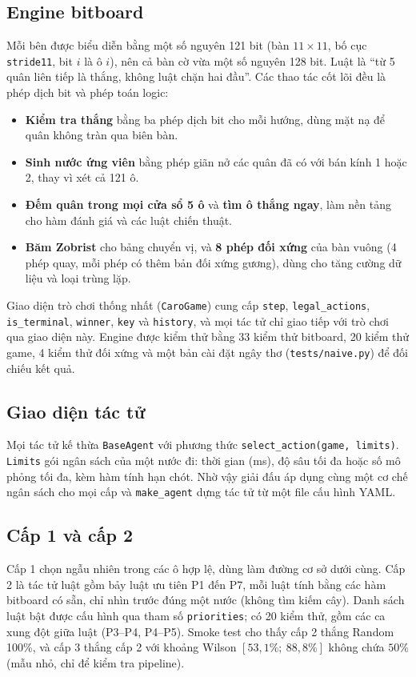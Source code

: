 \documentclass[12pt,a4paper]{report}
\newenvironment{gon}{\begin{itemize}\setlength{\itemsep}{2pt}\setlength{\parskip}{0pt}}{\end{itemize}}
\begin{document}
\subsection{Engine bitboard}
Mỗi bên được biểu diễn bằng một số nguyên 121 bit (bàn $11\times11$, bố cục \texttt{stride11}, bit $i$ là ô $i$), nên cả bàn cờ vừa một số nguyên 128 bit. Luật là ``từ 5 quân liên tiếp là thắng, không luật chặn hai đầu''. Các thao tác cốt lõi đều là phép dịch bit và phép toán logic:
\begin{gon}
  \item \textbf{Kiểm tra thắng} bằng ba phép dịch bit cho mỗi hướng, dùng mặt nạ để quân không tràn qua biên bàn.
  \item \textbf{Sinh nước ứng viên} bằng phép giãn nở các quân đã có với bán kính 1 hoặc 2, thay vì xét cả 121 ô.
  \item \textbf{Đếm quân trong mọi cửa sổ 5 ô} và \textbf{tìm ô thắng ngay}, làm nền tảng cho hàm đánh giá và các luật chiến thuật.
  \item \textbf{Băm Zobrist} cho bảng chuyển vị, và \textbf{8 phép đối xứng} của bàn vuông (4 phép quay, mỗi phép có thêm bản đối xứng gương), dùng cho tăng cường dữ liệu và loại trùng lặp.
\end{gon}
Giao diện trò chơi thống nhất (\texttt{CaroGame}) cung cấp \texttt{step}, \texttt{legal\_actions}, \texttt{is\_terminal}, \texttt{winner}, \texttt{key} và \texttt{history}, và mọi tác tử chỉ giao tiếp với trò chơi qua giao diện này. Engine được kiểm thử bằng 33 kiểm thử bitboard, 20 kiểm thử game, 4 kiểm thử đối xứng và một bản cài đặt ngây thơ (\texttt{tests/naive.py}) để đối chiếu kết quả.

\subsection{Giao diện tác tử}
Mọi tác tử kế thừa \texttt{BaseAgent} với phương thức \texttt{select\_action(game, limits)}. \texttt{Limits} gói ngân sách của một nước đi: thời gian (ms), độ sâu tối đa hoặc số mô phỏng tối đa, kèm hàm tính hạn chót. Nhờ vậy giải đấu áp dụng cùng một cơ chế ngân sách cho mọi cấp và \texttt{make\_agent} dựng tác tử từ một file cấu hình YAML.

\subsection{Cấp 1 và cấp 2}
Cấp 1 chọn ngẫu nhiên trong các ô hợp lệ, dùng làm đường cơ sở dưới cùng. Cấp 2 là tác tử luật gồm bảy luật ưu tiên P1 đến P7, mỗi luật tính bằng các hàm bitboard có sẵn, chỉ nhìn trước đúng một nước (không tìm kiếm cây). Danh sách luật bật được cấu hình qua tham số \texttt{priorities}; có 20 kiểm thử, gồm các ca xung đột giữa luật (P3--P4, P4--P5). Smoke test cho thấy cấp 2 thắng Random 100\%, và cấp 3 thắng cấp 2 với khoảng Wilson $[53{,}1\%;\ 88{,}8\%]$ không chứa $50\%$ (mẫu nhỏ, chỉ để kiểm tra pipeline).
\end{document}

